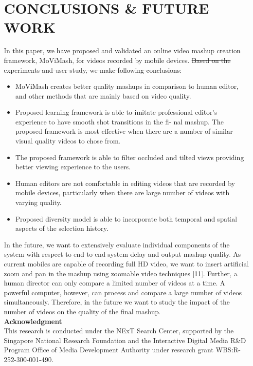 \documentclass{sig-alternate-05-2015}
\providecommand{\DIFadd}[1]{{\protect\color{blue}\uwave{#1}}} %
\providecommand{\DIFdel}[1]{{\protect\color{red}\sout{#1}}}                      %
\providecommand{\DIFaddbegin}{} %
\providecommand{\DIFaddend}{} %
\providecommand{\DIFdelbegin}{} %
\providecommand{\DIFdelend}{} %
\begin{document}
\section{CONCLUSIONS \& FUTURE WORK}
In this paper, we have proposed and validated an online video
mashup creation framework, MoViMash, for videos recorded by
mobile devices. \DIFdelbegin \DIFdel{Based on the experiments and user study, we make
following conclusions}\DIFdelend \DIFaddbegin \DIFadd{I am sahil}\DIFaddend :
 \begin{itemize} 
    \item MoViMash creates better quality mashups in comparison to
human editor, and other methods that are mainly based on
video quality.
    \item Proposed learning framework is able to imitate professional
editor’s experience to have smooth shot transitions in the fi-
nal mashup. The proposed framework is most effective when there are a number of similar visual quality videos to chose
from.
    \item The proposed framework is able to filter occluded and tilted
views providing better viewing experience to the users.
    \item Human editors are not comfortable in editing videos that are
recorded by mobile devices, particularly when there are large
number of videos with varying quality.
    \item Proposed diversity model is able to incorporate both temporal and spatial aspects of the selection history.
 \end{itemize} 
In the future, we want to extensively evaluate individual components of the system with respect to end-to-end system delay and
output mashup quality. As current mobiles are capable of recording full HD video, we want to insert artificial zoom and pan in the
mashup using zoomable video techniques [11]. Further, a human
director can only compare a limited number of videos at a time.
A powerful computer, however, can process and compare a large
number of videos simultaneously. Therefore, in the future we want
to study the impact of the number of videos on the quality of the
final mashup.\\
\textbf{Acknowledgment}\\
This research is conducted under the NExT Search Center, supported by the Singapore National Research Foundation and the Interactive Digital Media R\&D Program Office of Media Development Authority under research grant WBS:R-252-300-001-490.









%
%
\end{document}
